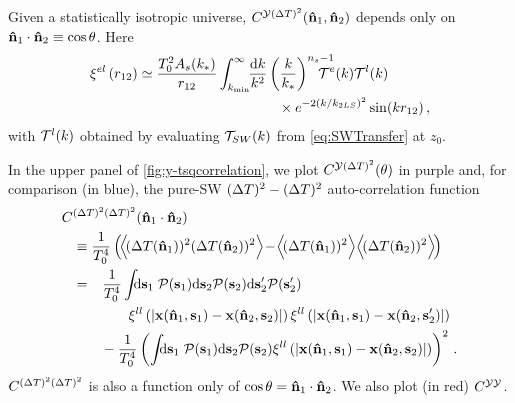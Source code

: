 \documentclass[fleqn,usenatbib]{mnras}
\begin{document}
    Given a statistically isotropic universe, $C^{\mathcal{Y}(\Delta
    T)^2}(\mathbf{{\bf\hat{n}}}_1,\mathbf{{\bf\hat{n}}}_2)$ depends only on
    ${\bf\hat{n}}_1\cdot{\bf\hat{n}}_2\equiv\cos\theta$.  Here
    \begin{align}\label{eqn:xiearlylateofdeltar}
        \xi^{el}\left(r_{12} \right) 
        &\simeq
            \frac{T_0^2 A_s(k_*)}{r_{12}}
               \int_{k_{\rm min}}^{\infty} \!\! \frac{\dif{k}}{k^2} 
                    \left(\frac{k}{k_*}\right)^{n_s-1}
                    \!\!\!\!\!\!\!\! \mcal{T}^{e}(k)
                    \mcal{T}^{l}(k) \\
            &\qquad \qquad \qquad \qquad \qquad \times 
                \Exp{-2 (k/k_{2LS})^2} \sin(k r_{12})   \,,\nonumber
    \end{align}
    with ${\cal{T}}^l(k) $ obtained by evaluating ${\cal{T}}_{SW}(k)$ from
    \eqref{eq:SWTransfer} at $z_0$.

    In the upper panel of \autoref{fig:y-tsqcorrelation}, we plot
    $C^{\mathcal{Y}({\Delta T})^2}(\theta)$ in purple and, for comparison (in blue), the
    pure-SW $({\Delta T})^2-({\Delta T})^2$ auto-correlation function
    \begin{align}
        C&^{(\DeltaT)^2 (\DeltaT)^2}(\mbf{\nhat}_1\cdot\mbf{\nhat}_2) \nonumber
        \\
        &\equiv
            \frac{1}{T_0^4}
            \left(\!
                \Big\langle \!(\DeltaT(\nhat_1))^2(\DeltaT(\nhat_2))^2 \Big\rangle
                \!-\! \Big\langle\!(\DeltaT(\nhat_1))^2\Big\rangle \Big\langle\!(\DeltaT(\nhat_2))^2 \Big\rangle
            \!\right)
        \\
        &=
            \phantom{+}\frac{1}{T_0^4}
            \int\!\!\! \dif{\mbf{s}_1} \; \mcal{P}(\mbf{s}_1) \dif{\mbf{s}_2} \mcal{P}(\mbf{s}_2) \dif{\mbf{s}'_2} \mcal{P}(\mbf{s}'_2)
            \\
            &\qquad\qquad
                \xi^{ll}\left(\norm{ \mbf{x}(\nhat_1,\mbf{s}_1) - \mbf{x}(\nhat_2,\mbf{s}_2) }\right)
                \xi^{ll}\left(\norm{ \mbf{x}(\nhat_1,\mbf{s}_1) - \mbf{x}(\nhat_2,\mbf{s}'_2) }\right) \nonumber 
            \\ &\qquad
                    - \frac{1}{T_0^4} \left( \int\!\!\! \dif{\mbf{s}_1} \; \mcal{P}(\mbf{s}_1) \dif{\mbf{s}_2} \mcal{P}(\mbf{s}_2)
                        \xi^{ll}\left(\norm{\mbf{x}(\nhat_1,\mbf{s}_1) - \mbf{x}(\nhat_2,\mbf{s}_2) }\right)
                        \right)^2
                    \nonumber\,.
    \end{align}
    $C^{({\Delta T})^2({\Delta T})^2}$ is also a function only of
    $\cos\theta={\bf\hat{n}}_1\cdot{\bf\hat{n}}_2$.  
    We also plot (in red) $C^{\mathcal{Y}\mathcal{Y}}$.
    
\end{document}
